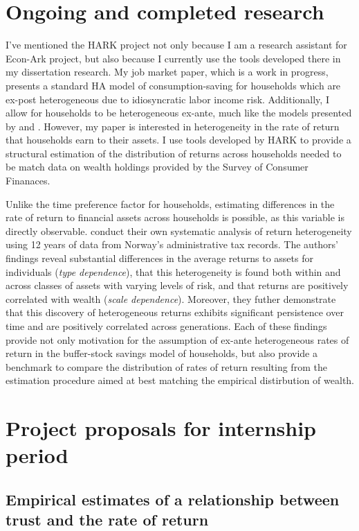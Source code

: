 \documentclass{scrartcl}
\begin{document}
\section{Ongoing and completed research}

I've mentioned the HARK project not only because I am a research assistant for Econ-Ark project, but also because I currently use the tools developed there in my dissertation research. My job market paper, which is a work in progress, presents a standard HA model of consumption-saving for households which are ex-post heterogeneous due to idiosyncratic labor income risk. Additionally, I allow for households to be heterogeneous ex-ante, much like the models presented by \cite{ks1998} and \cite{cstw2017}. However, my paper is interested in heterogeneity in the rate of return that households earn to their assets. I use tools developed by HARK to provide a structural estimation of the distribution of returns across households needed to be match data on wealth holdings provided by the Survey of Consumer Finanaces.

Unlike the time preference factor for households, estimating differences in the rate of return to financial assets across households is possible, as this variable is directly observable. \cite{aflgdmlp20} conduct their own systematic analysis of return heterogeneity using 12 years of data from Norway's administrative tax records. The authors' findings reveal substantial differences in the average returns to assets for individuals (\textit{type dependence}), that this heterogeneity is found both within and across classes of assets with varying levels of risk, and that returns are positively correlated with wealth  (\textit{scale dependence}). Moreover, they futher demonstrate that this discovery of heterogeneous returns exhibits significant persistence over time and are positively correlated across generations. Each of these findings provide not only motivation for the assumption of ex-ante heterogeneous rates of return in the buffer-stock savings model of households, but also provide a benchmark to compare the distribution of rates of return resulting from the estimation procedure aimed at best matching the empirical distirbution of wealth.

\section{Project proposals for internship period}

\subsection{Empirical estimates of a relationship between trust and the rate of return}
\end{document}
